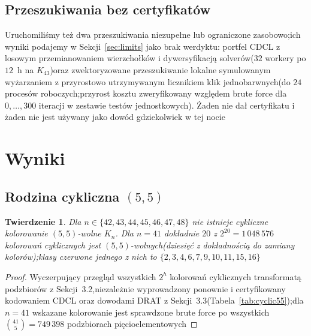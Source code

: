 \documentclass[11pt]{article}
\newtheorem{theorem}{Twierdzenie}
\theoremstyle{definition}
\theoremstyle{plain}
\newcommand{\K}{\ensuremath{K}}
\begin{document}
\subsection{Przeszukiwania bez certyfikatów}\label{sec:noncerts}
Uruchomiliśmy też dwa przeszukiwania niezupełne lub ograniczone zasobowo;ich wyniki podajemy w Sekcji~\ref{sec:limits} jako brak werdyktu: portfel CDCL z losowym przemianowaniem wierzchołków i dywersyfikacją solverów($32$ workery po $12$~h na $\K_{43}$)oraz zwektoryzowane przeszukiwanie lokalne symulowanym wyżarzaniem z przyrostowo utrzymywanym licznikiem klik jednobarwnych(do $24$ procesów roboczych;przyrost kosztu zweryfikowany względem brute force dla $0,\dots,300$ iteracji w zestawie testów jednostkowych). Żaden nie dał certyfikatu i żaden nie jest używany jako dowód gdziekolwiek w tej nocie

\section{Wyniki}\label{sec:results}

\subsection{Rodzina cykliczna $(5,5)$}\label{sec:res55}

\begin{theorem}\label{thm:cyclic}
Dla $n \in \{42,43,44,45,46,47,48\}$ nie istnieje cykliczne kolorowanie $(5,5)$-wolne $\K_n$. Dla $n = 41$ dokładnie $20$ z $2^{20} = 1\,048\,576$ kolorowań cyklicznych jest $(5,5)$-wolnych(dziesięć z dokładnością do zamiany kolorów);klasy czerwone jednego z nich to $\{2,3,4,6,7,9,10,11,15,16\}$\end{theorem}

\begin{proof}
Wyczerpujący przegląd wszystkich $2^h$ kolorowań cyklicznych transformatą podzbiorów z Sekcji~3.2,niezależnie wyprowadzony ponownie i certyfikowany kodowaniem CDCL oraz dowodami DRAT z Sekcji~3.3(Tabela~\ref{tab:cyclic55});dla $n=41$ wskazane kolorowanie jest sprawdzone brute force po wszystkich $\binom{41}{5} = 749\,398$ podzbiorach pięcioelementowych\end{proof}
\end{document}
